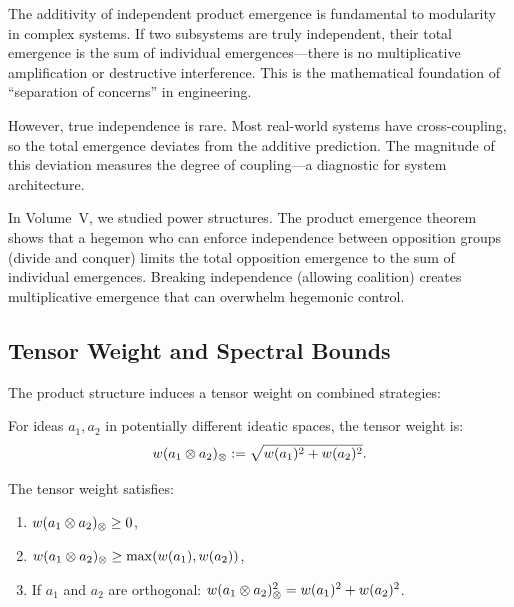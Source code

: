 \begin{interpretation}
The additivity of independent product emergence is fundamental to modularity
in complex systems. If two subsystems are truly independent, their total
emergence is the sum of individual emergences---there is no multiplicative
amplification or destructive interference. This is the mathematical foundation
of ``separation of concerns'' in engineering.

However, true independence is rare. Most real-world systems have cross-coupling,
so the total emergence deviates from the additive prediction. The magnitude of
this deviation measures the degree of coupling---a diagnostic for system
architecture.

In Volume~V, we studied power structures. The product emergence theorem shows
that a hegemon who can enforce independence between opposition groups (divide
and conquer) limits the total opposition emergence to the sum of individual
emergences. Breaking independence (allowing coalition) creates multiplicative
emergence that can overwhelm hegemonic control.
\end{interpretation}

\subsection{Tensor Weight and Spectral Bounds}

The product structure induces a tensor weight on combined strategies:

\begin{definition}
\label{def:tensor-weight}
For ideas $a_1, a_2$ in potentially different ideatic spaces, the tensor weight is:
\[
  w(a_1 \otimes a_2)_{\otimes} := \sqrt{w(a_1)^2 + w(a_2)^2}.
\]
\end{definition}

\begin{theorem}
\label{thm:tensor-weight-bounds}
The tensor weight satisfies:
\begin{enumerate}
  \item $w(a_1 \otimes a_2)_{\otimes} \geq 0$,
  \item $w(a_1 \otimes a_2)_{\otimes} \geq \max(w(a_1), w(a_2))$,
  \item If $a_1$ and $a_2$ are orthogonal: $w(a_1 \otimes a_2)_{\otimes}^2 = w(a_1)^2 + w(a_2)^2$.
\end{enumerate}
\end{theorem}

